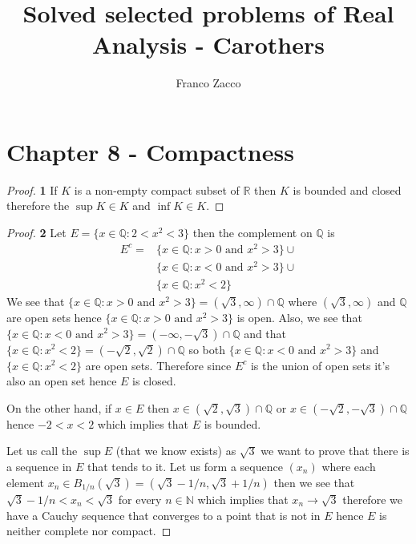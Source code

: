 \documentclass[11pt]{article}
\title{\textbf{Solved selected problems of Real Analysis - Carothers}}
\author{Franco Zacco}
\date{}
\newcommand{\N}{\mathbb{N}}
\newcommand{\Q}{\mathbb{Q}}
\newcommand{\R}{\mathbb{R}}
\theoremstyle{definition}
\begin{document}
\maketitle
\thispagestyle{empty}

\section*{Chapter 8 - Compactness}

	\begin{proof}{\textbf{1}}
        If $K$ is a non-empty compact subset of $\R$ then $K$ is bounded and
        closed therefore the $\sup K \in K$ and $\inf K \in K$.  
    \end{proof}
	\begin{proof}{\textbf{2}}
        Let $E = \{x \in \Q: 2 < x^2 < 3\}$ then the complement on $\Q$ is
        \begin{align*}
            E^c = &\{x \in \Q: x > 0 \text{ and } x^2 > 3\} \cup\\
            &\{x \in \Q: x < 0 \text{ and } x^2 > 3\} \cup\\
            &\{x \in \Q: x^2 < 2\}
        \end{align*}
        We see that
        $\{x \in \Q: x > 0 \text{ and } x^2 > 3\} = (\sqrt{3},\infty) \cap\Q$
        where $(\sqrt{3},\infty)$ and $\Q$ are open sets hence
        $\{x \in \Q: x > 0 \text{ and } x^2 > 3\}$ is open.
        Also, we see that
        $\{x \in \Q: x < 0 \text{ and } x^2 > 3\} = (-\infty, -\sqrt{3}) \cap\Q$
        and that $\{x \in \Q: x^2 < 2\} = (-\sqrt{2},\sqrt{2}) \cap \Q$
        so both $\{x \in \Q: x < 0 \text{ and } x^2 > 3\}$ and
        $\{x \in \Q: x^2 < 2\}$ are open sets. Therefore since $E^c$ is the
        union of open sets it's also an open set hence $E$ is closed.

        On the other hand, if $x \in E$ then $x \in (\sqrt{2}, \sqrt{3}) \cap \Q$
        or $x \in (-\sqrt{2}, -\sqrt{3}) \cap \Q$ hence $-2< x < 2$ which
        implies that $E$ is bounded.

        Let us call the $\sup E$ (that we know exists) as $\sqrt{3}$ we want
        to prove that there is a sequence in $E$ that tends to it.
        Let us form a sequence $(x_n)$ where each element
        $x_n \in B_{1/n}(\sqrt{3}) = (\sqrt{3} - 1/n, \sqrt{3} + 1/n)$ then we see
        that $\sqrt{3} - 1/n < x_n < \sqrt{3}$ for every $n \in \N$ which
        implies that $x_n \to \sqrt{3}$ therefore we have a Cauchy sequence
        that converges to a point that is not in $E$ hence $E$ is neither
        complete nor compact.
    \end{proof}
\end{document}
